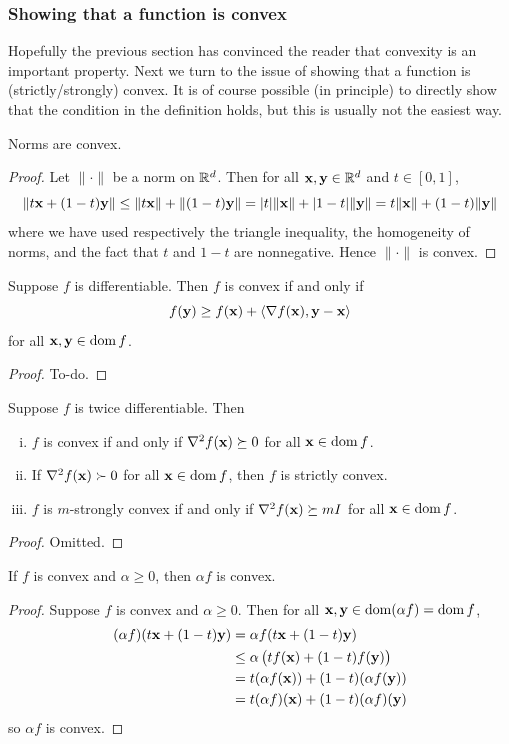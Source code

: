 \subsubsection{Showing that a function is convex}
Hopefully the previous section has convinced the reader that convexity is an important property.
Next we turn to the issue of showing that a function is (strictly/strongly) convex.
It is of course possible (in principle) to directly show that the condition in the definition holds, but this is usually not the easiest way.

\begin{proposition}
Norms are convex.
\end{proposition}
\begin{proof}
Let $\|\cdot\|$ be a norm on $\mathbb{R}^d$. Then for all $\mathbf{x}, \mathbf{y} \in \mathbb{R}^d$ and $t \in [0,1]$,
\[\|t\mathbf{x} + (1-t)\mathbf{y}\| \leq \|t\mathbf{x}\| + \|(1-t)\mathbf{y}\| = |t|\|\mathbf{x}\| + |1-t|\|\mathbf{y}\| = t\|\mathbf{x}\| + (1-t)\|\mathbf{y}\|\]
where we have used respectively the triangle inequality, the homogeneity of norms, and the fact that $t$ and $1-t$ are nonnegative.
Hence $\|\cdot\|$ is convex.
\end{proof}

\begin{proposition}
Suppose $f$ is differentiable. Then $f$ is convex if and only if
\[f(\mathbf{y}) \geq f(\mathbf{x}) + \langle \nabla f(\mathbf{x}), \mathbf{y} - \mathbf{x} \rangle\]
for all $\mathbf{x}, \mathbf{y} \in \operatorname*{dom} f$.
\end{proposition}
\begin{proof}
To-do.
\end{proof}

\begin{proposition}
Suppose $f$ is twice differentiable.
Then
\begin{enumerate}[(i)]
\item $f$ is convex if and only if $\nabla^2 f(\mathbf{x}) \succeq 0$ for all $\mathbf{x} \in \operatorname*{dom} f$.
\item If $\nabla^2 f(\mathbf{x}) \succ 0$ for all $\mathbf{x} \in \operatorname*{dom} f$, then $f$ is strictly convex.
\item $f$ is $m$-strongly convex if and only if $\nabla^2 f(\mathbf{x}) \succeq mI$ for all $\mathbf{x} \in \operatorname*{dom} f$.
\end{enumerate}
\end{proposition}
\begin{proof}
Omitted.
\end{proof}

\begin{proposition}
If $f$ is convex and $\alpha \geq 0$, then $\alpha f$ is convex.
\end{proposition}
\begin{proof}
Suppose $f$ is convex and $\alpha \geq 0$. Then for all $\mathbf{x}, \mathbf{y} \in \operatorname*{dom}(\alpha f) = \operatorname*{dom} f$,
\begin{align*}
(\alpha f)(t\mathbf{x} + (1-t)\mathbf{y}) &= \alpha f(t\mathbf{x} + (1-t)\mathbf{y}) \\
&\leq \alpha\left(tf(\mathbf{x}) + (1-t)f(\mathbf{y})\right) \\
&= t(\alpha f(\mathbf{x})) + (1-t)(\alpha f(\mathbf{y})) \\
&= t(\alpha f)(\mathbf{x}) + (1-t)(\alpha f)(\mathbf{y})
\end{align*}
so $\alpha f$ is convex.
\end{proof}

